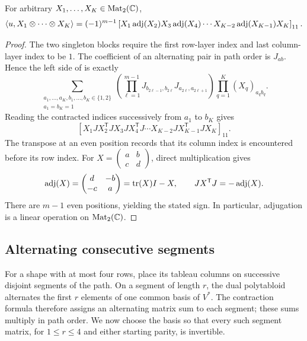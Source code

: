 \begin{lemma}\label{path:contraction}
For arbitrary $X_1,\ldots,X_K\in\operatorname{Mat}_2(\mathbb C)$,
\begin{equation}\label{path:contraction-formula}
 \left\langle u,X_1\otimes\cdots\otimes X_K\right\rangle
 =(-1)^{m-1}
 \left[X_1\operatorname{adj}(X_2)X_3\operatorname{adj}(X_4)\cdots
                 X_{K-2}\operatorname{adj}(X_{K-1})X_K\right]_{11}.
\end{equation}
\end{lemma}

\begin{proof}
The two singleton blocks require the first row-layer index and last
column-layer index to be $1$. The coefficient of an alternating pair in
path order is $J_{ab}$. Hence the left side of
 is exactly
\begin{equation}\label{path:index-sum}
 \sum_{\substack{a_1,\ldots,a_K,b_1,\ldots,b_K\in\{1,2\}\\
                  a_1=b_K=1}}
 \left(\prod_{\ell=1}^{m-1}
   J_{b_{2\ell-1},b_{2\ell}}J_{a_{2\ell},a_{2\ell+1}}\right)
 \prod_{q=1}^K(X_q)_{a_qb_q}.
\end{equation}
Reading the contracted indices successively from $a_1$ to $b_K$ gives
\[
 \left[X_1JX_2^{\mathsf T}JX_3JX_4^{\mathsf T}J
       \cdots X_{K-2}JX_{K-1}^{\mathsf T}JX_K\right]_{11}.
\]
The transpose at an even position records that its column index is
encountered before its row index. For
$X=\left(\begin{smallmatrix}a&b\\c&d\end{smallmatrix}\right)$,
direct multiplication gives
\begin{equation}\label{path:adjugate}
 \operatorname{adj}(X)=\begin{pmatrix}d&-b\\-c&a\end{pmatrix}
        =\operatorname{tr}(X)I-X,\qquad JX^{\mathsf T}J=-\operatorname{adj}(X).
\end{equation}
There are $m-1$ even positions, yielding the stated sign.
In particular, adjugation is a linear operation on $\operatorname{Mat}_2(\mathbb C)$.
\end{proof}

\subsection{Alternating consecutive segments}

For a shape with at most four rows, place its tableau columns on
successive disjoint segments of the path. On a segment of length $r$,
the dual polytabloid alternates the first $r$ elements of one common
basis of $V^*$. The contraction formula therefore assigns an alternating
matrix sum to each segment; these sums multiply in path order.
We now choose the basis so that every such segment matrix, for
$1\le r\le4$ and either starting parity, is invertible.

